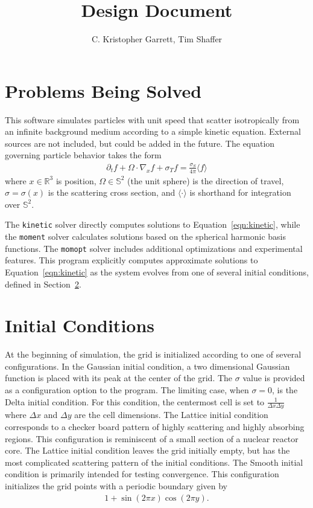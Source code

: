 \documentclass{article}
\title{Design Document}
\author{C. Kristopher Garrett, Tim Shaffer}
\newcommand{\integral}[1]{\ensuremath{\langle #1 \rangle}}
\newcommand{\twosphere}{\ensuremath{\mathbb{S}^2}\xspace}
\newcommand{\threespace}{\ensuremath{\mathbb{R}^3}\xspace}
\newcommand{\kinetic}{\texttt{kinetic}\xspace}
\newcommand{\moment}{\texttt{moment}\xspace}
\newcommand{\momopt}{\texttt{momopt}\xspace}
\begin{document}
\maketitle

\section{Problems Being Solved}
This software simulates particles with unit speed that scatter isotropically from
an infinite background medium according to a simple kinetic equation. External sources
are not included, but could be added in the future. The equation governing particle
behavior takes the form
\begin{align}
    \label{eqn:kinetic}
    \partial_t f + \Omega \cdot \nabla_x f + \sigma_T f =
    \frac{\sigma_S}{4\pi} \integral{f}
\end{align}
where $x \in \threespace$ is position, $\Omega \in \twosphere$ (the unit sphere)
is the direction of travel, $\sigma = \sigma(x)$ is the scattering cross section, and
\integral{\cdot} is shorthand for integration over \twosphere.

The \kinetic solver directly computes solutions to
Equation~\ref{eqn:kinetic}, while the \moment solver calculates solutions based on
the spherical harmonic basis functions. The \momopt solver includes additional
optimizations and experimental features. This program explicitly computes approximate
solutions to Equation~\ref{eqn:kinetic} as
the system evolves from one of several initial conditions, defined in
Section~\ref{sec:initcond}.

\section{Initial Conditions}
\label{sec:initcond}
At the beginning of simulation, the grid is initialized according to one of several
configurations. In the Gaussian initial condition, a two dimensional Gaussian function
is placed with its peak at the center of the grid. The $\sigma$ value is provided as
a configuration option to the program. The limiting case, when $\sigma=0$, is the
Delta initial condition. For this condition, the centermost cell is set to
$\frac{1}{\Delta x \Delta y}$ where $\Delta x$ and $\Delta y$ are the cell
dimensions. The Lattice initial condition corresponds to a checker board pattern
of highly scattering and highly absorbing regions. This configuration is reminiscent of a
small section of a nuclear reactor core. The Lattice initial condition leaves the
grid initially empty, but has the most complicated scattering pattern of the initial
conditions. The Smooth initial condition is primarily intended for testing convergence.
This configuration initializes the grid points with a periodic boundary given by
\begin{align}
1 + \sin(2\pi x)\cos(2\pi y).
\end{align}
\end{document}
